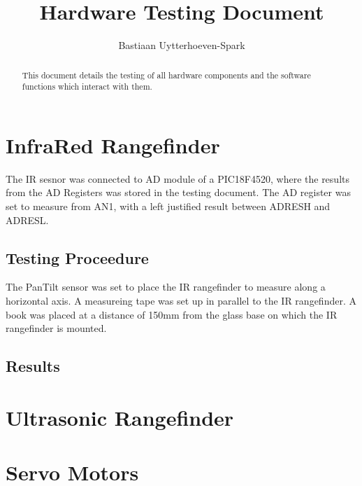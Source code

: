 \documentclass[]{article}
\title{Hardware Testing Document}
\author{Bastiaan Uytterhoeven-Spark}
\begin{document}
\maketitle

\newpage

\begin{abstract}
This document details the testing of all hardware components and the software functions which interact with them.
\end{abstract}

\newpage
\section{InfraRed Rangefinder}
The IR sesnor was connected to AD module of a PIC18F4520, where the results from the AD Registers was stored in the testing document. The AD register was set to measure from AN1, with a left justified result between ADRESH and ADRESL. 
\subsection{Testing Proceedure}
The PanTilt sensor was set to place the IR rangefinder to measure along a horizontal axis. A measureing tape was set up in parallel to the IR rangefinder. A book was placed at a distance of 150mm from the glass base on which the IR rangefinder is mounted. 

\subsection{Results}	
\section{Ultrasonic Rangefinder}
\section{Servo Motors}
\end{document}
